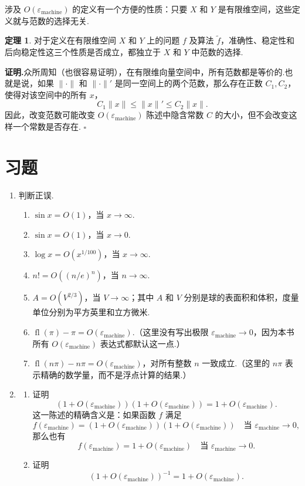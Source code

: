 \documentclass[UTF8,fontset=none,12pt]{ctexart}
\newcommand{\epsmach}{\varepsilon_{\mathrm{machine}}}
\newcommand{\fl}{\operatorname{fl}}
\theoremstyle{definition}
\newtheorem{theorem}{定理}
\begin{document}
涉及 $O(\epsmach)$ 的定义有一个方便的性质：只要 $X$ 和 $Y$ 是有限维空间，这些定义就与范数的选择无关.

\begin{theorem}
对于定义在有限维空间 $X$ 和 $Y$ 上的问题 $f$ 及算法 $\widetilde f$，准确性、稳定性和后向稳定性这三个性质是否成立，都独立于 $X$ 和 $Y$ 中范数的选择.
\end{theorem}

\textbf{证明.}众所周知（也很容易证明），在有限维向量空间中，所有范数都是等价的.也就是说，如果 $\|\cdot\|$ 和 $\|\cdot\|'$ 是同一空间上的两个范数，那么存在正数 $C_1,C_2$，使得对该空间中的所有 $x$，
\[
    C_1\|x\|\le\|x\|'\le C_2\|x\|.
\]
因此，改变范数可能改变 $O(\epsmach)$ 陈述中隐含常数 $C$ 的大小，但不会改变这样一个常数是否存在. \hfill$\square$

\section*{习题}

\begin{enumerate}[label=\textbf{14.\arabic*}]
    \item 判断正误.
    \begin{enumerate}[label=(\alph*)]
        \item $\sin x=O(1)$，当 $x\to\infty$.
        \item $\sin x=O(1)$，当 $x\to0$.
        \item $\log x=O(x^{1/100})$，当 $x\to\infty$.
        \item $n!=O((n/e)^n)$，当 $n\to\infty$.
        \item $A=O(V^{2/3})$，当 $V\to\infty$；其中 $A$ 和 $V$ 分别是球的表面积和体积，度量单位分别为平方英里和立方微米.
        \item $\fl(\pi)-\pi=O(\epsmach)$.（这里没有写出极限 $\epsmach\to0$，因为本书所有 $O(\epsmach)$ 表达式都默认这一点.）
        \item $\fl(n\pi)-n\pi=O(\epsmach)$，对所有整数 $n$ 一致成立.（这里的 $n\pi$ 表示精确的数学量，而不是浮点计算的结果.）
    \end{enumerate}

    \item
    \begin{enumerate}[label=(\alph*)]
        \item 证明
        \[
            (1+O(\epsmach))(1+O(\epsmach))
            =1+O(\epsmach).
        \]
        这一陈述的精确含义是：如果函数 $f$ 满足
        \[
            f(\epsmach)
            =(1+O(\epsmach))(1+O(\epsmach))
            \quad\text{当 }\epsmach\to0,
        \]
        那么也有
        \[
            f(\epsmach)=1+O(\epsmach)
            \quad\text{当 }\epsmach\to0.
        \]
        \item 证明
        \[
            (1+O(\epsmach))^{-1}=1+O(\epsmach).
        \]
    \end{enumerate}
\end{enumerate}
\end{document}
